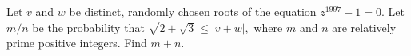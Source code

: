 Let $v$ and $w$ be distinct, randomly chosen roots of the equation $z^{1997}-1=0.$  Let $m/n$ be the probability that $\sqrt{2+\sqrt{3}}\le |v+w|,$ where $m$ and $n$ are relatively prime positive integers.  Find $m+n.$